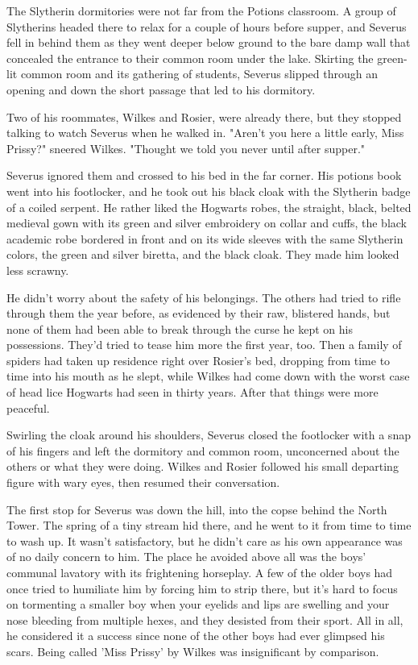 \documentclass[a4paper,11pt]{article}
\begin{document}
The Slytherin dormitories were not far from the Potions classroom. A group of Slytherins headed there to relax for a couple of hours before supper, and Severus fell in behind them as they went deeper below ground to the bare damp wall that concealed the entrance to their common room under the lake. Skirting the green-lit common room and its gathering of students, Severus slipped through an opening and down the short passage that led to his dormitory.

Two of his roommates, Wilkes and Rosier, were already there, but they stopped talking to watch Severus when he walked in. "Aren't you here a little early, Miss Prissy?" sneered Wilkes. "Thought we told you never until after supper."

Severus ignored them and crossed to his bed in the far corner. His potions book went into his footlocker, and he took out his black cloak with the Slytherin badge of a coiled serpent. He rather liked the Hogwarts robes, the straight, black, belted medieval gown with its green and silver embroidery on collar and cuffs, the black academic robe bordered in front and on its wide sleeves with the same Slytherin colors, the green and silver biretta, and the black cloak. They made him looked less scrawny.

He didn't worry about the safety of his belongings. The others had tried to rifle through them the year before, as evidenced by their raw, blistered hands, but none of them had been able to break through the curse he kept on his possessions. They'd tried to tease him more the first year, too. Then a family of spiders had taken up residence right over Rosier's bed, dropping from time to time into his mouth as he slept, while Wilkes had come down with the worst case of head lice Hogwarts had seen in thirty years. After that things were more peaceful.

Swirling the cloak around his shoulders, Severus closed the footlocker with a snap of his fingers and left the dormitory and common room, unconcerned about the others or what they were doing. Wilkes and Rosier followed his small departing figure with wary eyes, then resumed their conversation.

The first stop for Severus was down the hill, into the copse behind the North Tower. The spring of a tiny stream hid there, and he went to it from time to time to wash up. It wasn't satisfactory, but he didn't care as his own appearance was of no daily concern to him. The place he avoided above all was the boys' communal lavatory with its frightening horseplay. A few of the older boys had once tried to humiliate him by forcing him to strip there, but it's hard to focus on tormenting a smaller boy when your eyelids and lips are swelling and your nose bleeding from multiple hexes, and they desisted from their sport. All in all, he considered it a success since none of the other boys had ever glimpsed his scars. Being called 'Miss Prissy' by Wilkes was insignificant by comparison.
\end{document}
